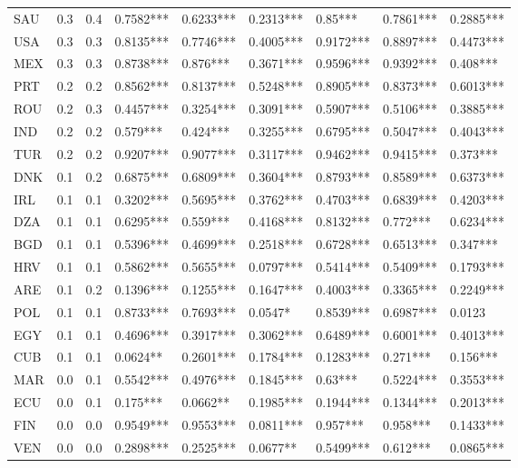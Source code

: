 \begin{table}[ht]
\begin{tabular}{lrrllllll}
  SAU & 0.3 & 0.4 & 0.7582*** & 0.6233*** & 0.2313*** & 0.85*** & 0.7861*** & 0.2885*** \\ 
  USA & 0.3 & 0.3 & 0.8135*** & 0.7746*** & 0.4005*** & 0.9172*** & 0.8897*** & 0.4473*** \\ 
  MEX & 0.3 & 0.3 & 0.8738*** & 0.876*** & 0.3671*** & 0.9596*** & 0.9392*** & 0.408*** \\ 
  PRT & 0.2 & 0.2 & 0.8562*** & 0.8137*** & 0.5248*** & 0.8905*** & 0.8373*** & 0.6013*** \\ 
  ROU & 0.2 & 0.3 & 0.4457*** & 0.3254*** & 0.3091*** & 0.5907*** & 0.5106*** & 0.3885*** \\ 
  IND & 0.2 & 0.2 & 0.579*** & 0.424*** & 0.3255*** & 0.6795*** & 0.5047*** & 0.4043*** \\ 
  TUR & 0.2 & 0.2 & 0.9207*** & 0.9077*** & 0.3117*** & 0.9462*** & 0.9415*** & 0.373*** \\ 
  DNK & 0.1 & 0.2 & 0.6875*** & 0.6809*** & 0.3604*** & 0.8793*** & 0.8589*** & 0.6373*** \\ 
  IRL & 0.1 & 0.1 & 0.3202*** & 0.5695*** & 0.3762*** & 0.4703*** & 0.6839*** & 0.4203*** \\ 
  DZA & 0.1 & 0.1 & 0.6295*** & 0.559*** & 0.4168*** & 0.8132*** & 0.772*** & 0.6234*** \\ 
  BGD & 0.1 & 0.1 & 0.5396*** & 0.4699*** & 0.2518*** & 0.6728*** & 0.6513*** & 0.347*** \\ 
  HRV & 0.1 & 0.1 & 0.5862*** & 0.5655*** & 0.0797*** & 0.5414*** & 0.5409*** & 0.1793*** \\ 
  ARE & 0.1 & 0.2 & 0.1396*** & 0.1255*** & 0.1647*** & 0.4003*** & 0.3365*** & 0.2249*** \\ 
  POL & 0.1 & 0.1 & 0.8733*** & 0.7693*** & 0.0547* & 0.8539*** & 0.6987*** & 0.0123  \\ 
  EGY & 0.1 & 0.1 & 0.4696*** & 0.3917*** & 0.3062*** & 0.6489*** & 0.6001*** & 0.4013*** \\ 
  CUB & 0.1 & 0.1 & 0.0624** & 0.2601*** & 0.1784*** & 0.1283*** & 0.271*** & 0.156*** \\ 
  MAR & 0.0 & 0.1 & 0.5542*** & 0.4976*** & 0.1845*** & 0.63*** & 0.5224*** & 0.3553*** \\ 
  ECU & 0.0 & 0.1 & 0.175*** & 0.0662** & 0.1985*** & 0.1944*** & 0.1344*** & 0.2013*** \\ 
  FIN & 0.0 & 0.0 & 0.9549*** & 0.9553*** & 0.0811*** & 0.957*** & 0.958*** & 0.1433*** \\ 
  VEN & 0.0 & 0.0 & 0.2898*** & 0.2525*** & 0.0677** & 0.5499*** & 0.612*** & 0.0865*** \\ 

\end{tabular}
\end{table}
